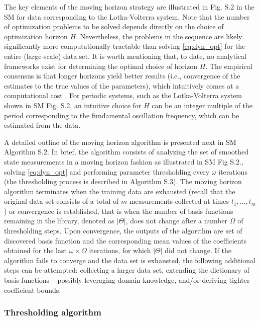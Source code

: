 \documentclass[12pt]{article}
\begin{document}
The key elements of the moving horizon strategy are illustrated in Fig. S.2 in the SM for data corresponding to the Lotka-Volterra system. Note that the number of optimization problems to be solved depends directly on the choice of optimization horizon $H$. Nevertheless, the problems in the sequence are likely significantly more computationally tractable than solving  \eqref{eq:dyn_opt} for the entire (large-scale) data set. It is worth mentioning that, to date, no analytical frameworks exist for determining the optimal choice of horizon $H$. The empirical consensus is that longer  horizons yield better results (i.e., convergence of the estimates to the true values of the parameters), which intuitively comes at a computational cost \cite{rao2002constrained}. For periodic systems, such as the Lotka-Volterra system shown in SM Fig. S.2, an intuitive choice for $H$ can be an integer multiple of the period corresponding to the fundamental oscillation frequency, which can be estimated from the data.

A detailed outline of the  moving horizon algorithm is presented next in SM  Algorithm S.2. In brief, the algorithm consists of analyzing the set of smoothed state measurements in a moving horizon fashion as illustrated in SM Fig S.2., solving \eqref{eq:dyn_opt} and performing parameter thresholding every $\omega$ iterations (the thresholding process is described in Algorithm S.3).  The moving horizon algorithm terminates when  the training data are exhausted (recall that the original data set consists of a total of $m$ measurements collected at times $t_1,\dots,t_m$) or convergence is established, that is when the number of basis functions remaining in the library, denoted as $|\Theta|$, does not change after a number $\Omega$  of thresholding steps. Upon convergence, the outputs of the algorithm are set of discovered basis function and the corresponding mean values of the coefficients obtained for the last $\omega\times\Omega$ iterations, for which $|\Theta|$ did not change. If the algorithm fails to converge and the data set is exhausted, the following additional steps can be attempted: collecting a larger data set, extending the dictionary of basis functions -- possibly leveraging domain knowledge, and/or deriving tighter coefficient bounds.

\subsubsection*{Thresholding algorithm}
\end{document}
